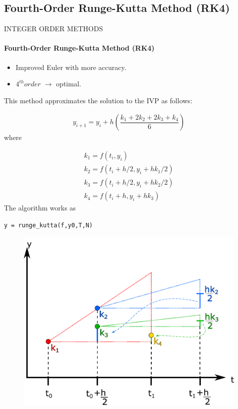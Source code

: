 \subsection{Fourth-Order Runge-Kutta Method (RK4)}
\begin{frame}{INTEGER ORDER METHODS}
    \framesubtitle{Fourth-Order Runge-Kutta Method (RK4)}
    \begin{itemize}
        \item Improved Euler with more accuracy.
        \item $4^{th} order$ $\rightarrow$ optimal.
    \end{itemize}
    This method approximates the solution to the IVP as follows:
    
    \begin{equation}
        \begin{split}
            y_{i+1}=y_i+h\left(\dfrac{k_1+2k_2+2k_3+k_4}{6}\right)
        \end{split}
    \end{equation}
    where
    \begin{multicols}{2}
    \begin{equation*}
    \begin{array} { l } { k _ { 1 } = f \left( t _ { i } , y _ { i } \right) } \\
    { k _ { 2 } = f \left( t _ { i } + h / 2 , y _ { i } + h k _ { 1 } / 2 \right) } \\
    { k _ { 3 } = f \left( t _ { i } + h / 2 , y _ { i } + h k _ { 2 } / 2 \right) } \\ 
    { k _ { 4 } = f \left( t _ { i } + h , y _ { i } + h k _ { 3 } \right) } \end{array}
\end{equation*}
The algorithm works as
\begin{center}
    \texttt{y = runge\_kutta(f,y0,T,N)}
\end{center}
\columnbreak
\begin{figure}[H]
    \centering
    \includegraphics[scale=0.275]{files/sv.pdf}
\end{figure}
\end{multicols}


\end{frame}

